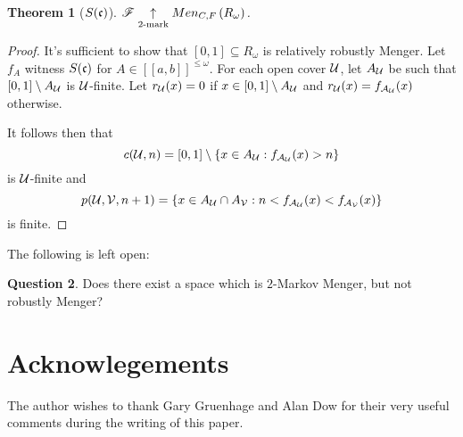 \documentclass{amsart}
\newtheorem{theorem}{Theorem}[section]
\theoremstyle{definition}
\newtheorem{question}[theorem]{Question}
\begin{document}
\begin{theorem}[\(S(\mathfrak{c})\)]
  \(\mathscr{F}\underset{2\text{-mark}}{\uparrow}Men_{C,F}\left({R_\omega}\right)\).
\end{theorem}

\begin{proof}
  It's sufficient to show that \([0,1]\subseteq R_\omega\) is relatively
  robustly Menger. Let \(f_A\) witness \(S(\mathfrak{c})\)
  for \(A\in[[a,b]]^{\leq\omega}\).
  For each open cover \(\mathcal{U}\), let \(A_{\mathcal{U}}\) be
  such that \([0,1]\setminus A_{\mathcal{U}}\) is \(\mathcal{U}\)-finite.
  Let \(r_{\mathcal{U}}(x)=0\) if \(x\in[0,1]\setminus A_{\mathcal{U}}\) and
  \(r_{\mathcal{U}}(x)=f_{\mathcal{A}_{\mathcal{U}}}(x)\) otherwise.

  It follows then that
    \[
      c(\mathcal{U},n) = [0,1]\setminus\{x\in A_{\mathcal{U}}:f_{\mathcal{A}_{\mathcal{U}}}(x)>n\}
    \]
  is \(\mathcal{U}\)-finite and
    \[
      p(\mathcal{U},\mathcal{V},n+1)
        =
      \{x\in A_{\mathcal{U}}\cap A_{\mathcal{V}}
        :
      n<f_{\mathcal{A}_{\mathcal{U}}}(x)<f_{\mathcal{A}_{\mathcal{V}}}(x)\}
    \]
  is finite.
\end{proof}

The following is left open:

\begin{question}
  Does there exist a space which is \(2\)-Markov Menger, but not
  robustly Menger?
\end{question}

\section*{Acknowlegements}

The author wishes to thank Gary Gruenhage and Alan Dow for their
very useful comments during the writing of this paper.



\end{document}
